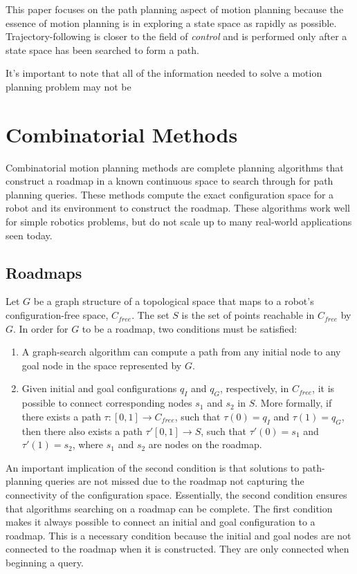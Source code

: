 \documentclass[10pt,conference]{ieeeconf}
\begin{document}
This paper focuses on the path planning aspect of motion planning because the essence of motion planning is in exploring a state space as rapidly as possible. Trajectory-following  is closer to the field of \emph{control} and is performed only after a state space has been searched to form a path.

It's important to note that all of the information needed to solve a motion planning problem may not be


\section{Combinatorial Methods} \label{sec:comb}
	
	Combinatorial motion planning methods are complete planning algorithms that construct a roadmap in a known continuous space to search through for path planning queries. These methods compute the exact configuration space for a robot and its environment to construct the roadmap. These algorithms work well for simple robotics problems, but do not scale up to many real-world applications seen today. 
	
\subsection{Roadmaps}
	
	Let $G$ be a graph structure of a topological space that maps to a robot's configuration-free space, $C_{free}$. The set $S$ is the set of points reachable in $C_{free}$ by $G$. In order for $G$ to be a roadmap, two conditions must be satisfied:
	\begin{enumerate}
	\item 
	A graph-search algorithm can compute a path from any initial node to any goal node in the space represented by $G$.
	
	\item
	Given initial and goal configurations $q_I$ and $q_G$, respectively, in $C_{free}$, it is possible to connect corresponding nodes $s_1$ and $s_2$ in $S$. More formally, if there exists a path $\tau :[0,1] \rightarrow C_{free}$, such that $\tau (0)=q_I$ and $\tau (1)=q_G$, then there also exists a path $\tau'[0,1] \rightarrow S$, such that $\tau'(0)=s_1$ and $\tau'(1)=s_2$, where $s_1$ and $s_2$ are nodes on the roadmap.
	\end{enumerate}
	
	An important implication of the second condition is that solutions to path-planning queries are not missed due to the roadmap not capturing the connectivity of the configuration space. Essentially, the second condition ensures that algorithms searching on a roadmap can be complete. The first condition makes it always possible to connect an initial and goal configuration to a roadmap. This is a necessary condition because the initial and goal nodes are not connected to the roadmap when it is constructed. They are only connected when beginning a query.
	
\end{document}
